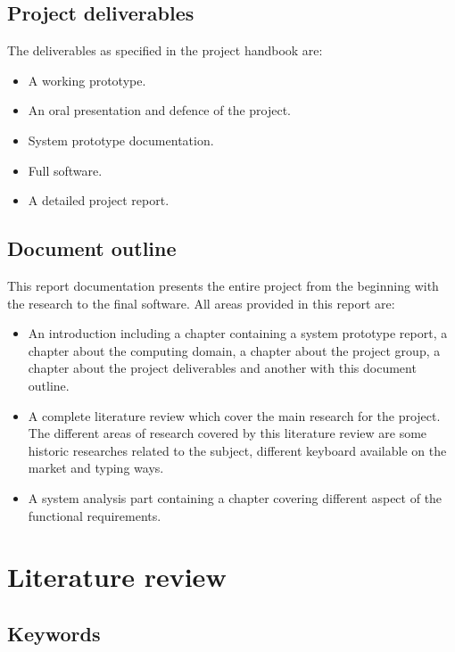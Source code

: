 \chapter{Project deliverables}
The deliverables as specified in the project handbook are:
\begin{itemize}
\item A working prototype.
\item An oral presentation and defence of the project.
\item System prototype documentation.
\item Full software.
\item A detailed project report.
\end{itemize}

\chapter{Document outline}
This report documentation presents the entire project from the beginning with the research to the final software.
All areas provided in this report are:
\begin{itemize}
\item An introduction including a chapter containing a system prototype report, a chapter about the computing domain, a chapter about the project group, a chapter about the project deliverables and another with this document outline.
\item A complete literature review which cover the main research for the project. The different areas of research covered by this literature review are some historic researches related to the subject, different keyboard available on the market and typing ways.  
\item A system analysis part containing a chapter covering different aspect of the functional requirements. 
\end{itemize}

\part{Literature review}
%
\chapter*{Keywords}
\begin{sortedlist}
\end{sortedlist}

